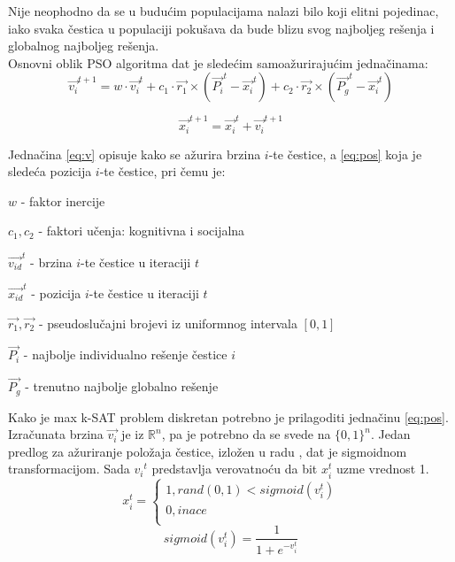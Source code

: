 \documentclass[a4paper]{article}
\begin{document}
Nije neophodno da se u budućim populacijama nalazi bilo koji elitni pojedinac, iako svaka čestica u populaciji pokušava da bude blizu svog najboljeg rešenja i globalnog najboljeg rešenja. \\ 


Osnovni oblik PSO algoritma dat je sledećim samoažurirajućim jednačinama: \\ 
\begin{equation}\label{eq:v}
\vec{v_{i}}^{t+1} = w \cdot \vec{v_{i}}^{t} + c_1 \cdot \vec{r_1} \times (\vec{P_{i}}^{t} - \vec{x_{i}}^{t}) + c_2\cdot \vec{r_2} \times (\vec{P_{g}}^{t} - \vec{x_{i}}^{t}) 
\end{equation}

\begin{equation}\label{eq:pos}
\vec{x_{i}}^{t+1} = \vec{x_{i}}^{t} + \vec{v_{i}}^{t+1} 
\end{equation}

Jednačina \ref{eq:v} opisuje kako se ažurira brzina $i$-te čestice, a \ref{eq:pos} koja je sledeća pozicija $i$-te čestice, pri čemu je: 

\begin{list}{•}{}
	\item $w$ - faktor inercije
	\item $c_1, c_2$ - faktori učenja: kognitivna i socijalna
	\item $\vec{v_{id}}^{t}$ - brzina $i$-te čestice u iteraciji $t$ 
	\item $\vec{x_{id}}^{t}$ - pozicija $i$-te čestice u iteraciji $t$ 
	\item $\vec{r_1}, \vec{r_2}$ - pseudoslučajni brojevi iz uniformnog intervala $[0,1]$
	\item $\vec{P_i}$ - najbolje individualno rešenje čestice $i$
	\item $\vec{P_g}$ - trenutno najbolje globalno rešenje\\ 
\end{list}

Kako je max k-SAT problem diskretan potrebno je prilagoditi jednačinu \ref{eq:pos}. Izračunata brzina $\vec{v_{i}}$ je iz $\mathbb{R}^n$, pa je potrebno da se svede na $\{ 0,1 \}^n$. Jedan predlog za ažuriranje položaja čestice, izložen u radu \cite{sigmoid}, dat je sigmoidnom transformacijom. Sada ${v_{i}}^{t}$ predstavlja verovatnoću da bit $x_{i}^{t}$ uzme vrednost 1.  \\

\begin{equation}\label{eq:posSIGMOID}
x_{i}^{t}=\begin{cases}
               1, rand(0,1) < sigmoid(v_{i}^{t})\\
               0, inace\\
            \end{cases}
\end{equation}\label{eq:sigmoid}
\begin{equation}
sigmoid(v_{i}^{t}) = \frac{1}{1+e^{-v_{i}^{t}}}
\end{equation}
 
\end{document}
